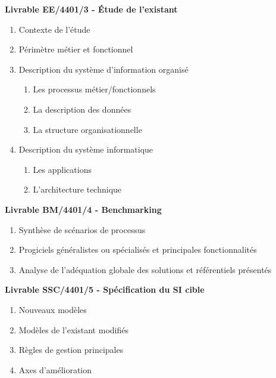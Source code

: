 \bf{Livrable EE/4401/3 - Étude de l’existant} \\

\begin{enumerate}
    \item Contexte de l'étude
    \item Périmètre métier et fonctionnel
    \item Description du système d'information organisé
        \begin{enumerate}
            \item Les processus métier/fonctionnels
            \item La description des données
            \item La structure organisationnelle
        \end{enumerate}
    \item Description du système informatique
        \begin{enumerate}
            \item Les applications
            \item L'architecture technique \\
        \end{enumerate}
\end{enumerate}

\bf{Livrable BM/4401/4 - Benchmarking} \\

\begin{enumerate}
    \item Synthèse de scénarios de processus
    \item Progiciels généralistes ou spécialisés et principales fonctionnalités
    \item Analyse de l'adéquation globale des solutions et référentiels présentés \\
\end{enumerate}

\bf{Livrable SSC/4401/5 - Spécification du SI cible} \\

\begin{enumerate}
    \item Nouveaux modèles
    \item Modèles de l'existant modifiés
    \item Règles de gestion principales
    \item Axes d'amélioration \\
\end{enumerate}

